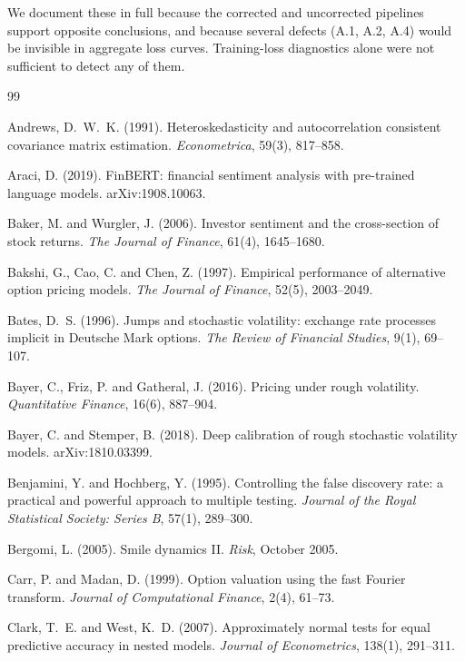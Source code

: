 \documentclass[11pt,a4paper]{article}
\begin{document}
We document these in full because the corrected and uncorrected pipelines
support opposite conclusions, and because several defects (A.1, A.2, A.4) would
be invisible in aggregate loss curves. Training-loss diagnostics alone were not
sufficient to detect any of them.

\begin{thebibliography}{99}

Andrews, D.~W.~K. (1991). Heteroskedasticity and autocorrelation consistent
covariance matrix estimation. \emph{Econometrica}, 59(3), 817--858.

Araci, D. (2019). FinBERT: financial sentiment analysis with pre-trained
language models. arXiv:1908.10063.

Baker, M. and Wurgler, J. (2006). Investor sentiment and the cross-section of
stock returns. \emph{The Journal of Finance}, 61(4), 1645--1680.

Bakshi, G., Cao, C. and Chen, Z. (1997). Empirical performance of alternative
option pricing models. \emph{The Journal of Finance}, 52(5), 2003--2049.

Bates, D.~S. (1996). Jumps and stochastic volatility: exchange rate processes
implicit in Deutsche Mark options. \emph{The Review of Financial Studies}, 9(1),
69--107.

Bayer, C., Friz, P. and Gatheral, J. (2016). Pricing under rough volatility.
\emph{Quantitative Finance}, 16(6), 887--904.

Bayer, C. and Stemper, B. (2018). Deep calibration of rough stochastic
volatility models. arXiv:1810.03399.

Benjamini, Y. and Hochberg, Y. (1995). Controlling the false discovery rate: a
practical and powerful approach to multiple testing. \emph{Journal of the Royal
Statistical Society: Series B}, 57(1), 289--300.

Bergomi, L. (2005). Smile dynamics II. \emph{Risk}, October 2005.

Carr, P. and Madan, D. (1999). Option valuation using the fast Fourier
transform. \emph{Journal of Computational Finance}, 2(4), 61--73.

Clark, T.~E. and West, K.~D. (2007). Approximately normal tests for equal
predictive accuracy in nested models. \emph{Journal of Econometrics}, 138(1),
291--311.


\end{thebibliography}
\end{document}
